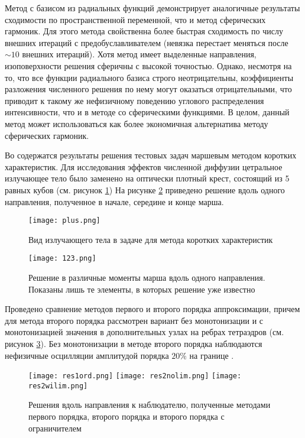 Метод с базисом из радиальных функций демонстрирует аналогичные результаты сходимости по пространственной переменной, что и метод сферических гармоник. Для этого метода свойственна более быстрая сходимость по числу внешних итераций с предобуславливателем (невязка перестает меняться после $\sim 10$ внешних итераций). Хотя метод имеет выделенные направления, изоповерхности решения сферичны с высокой точностью. Однако, несмотря на то, что все функции радиального базиса строго неотрицательны, коэффициенты разложения численного решения по нему могут оказаться отрицательными, что приводит к такому же нефизичному поведению углового распределения интенсивности, что и в методе со сферическими функциями. В целом, данный метод может использоваться как более экономичная альтернатива методу сферических гармоник.

Во  содержатся результаты решения тестовых задач маршевым методом коротких характеристик. Для исследования эффектов численной диффузии цетральное излучающее тело было заменено на оптически плотный крест, состоящий из 5 равных кубов (см. рисунок \ref{fig:plus})
На рисунке \ref{fig:march} приведено решение вдоль одного направления, полученное в начале, середине и конце марша.
\begin{figure}[ht!]
\centering
\texttt{[image: plus.png]}
\caption{Вид излучающего тела в задаче для метода коротких характеристик}
\label{fig:plus}
\end{figure}
\begin{figure}[ht!]
\centering
\texttt{[image: 123.png]}
\caption{Решение в различные моменты марша вдоль одного направления. Показаны лишь те элементы, в которых решение уже известно}
\label{fig:march}
\end{figure}

Проведено сравнение методов первого и второго порядка аппроксимации, причем для метода второго порядка рассмотрен вариант без монотонизации и с монотонизацией значения в дополнительных узлах на ребрах тетраэдров (см. рисунок \ref{fig:ord}). Без монотонизации в методе второго порядка наблюдаются нефизичные осцилляции амплитудой порядка $20\%$ на границе .
\begin{figure}[ht!]
\centering
\texttt{[image: res1ord.png]} %
\texttt{[image: res2nolim.png]} %
\texttt{[image: res2wilim.png]} %
\caption{Решения вдоль направления к наблюдателю, полученные методами первого порядка, второго порядка и второго порядка с ограничителем}
\label{fig:ord}
\end{figure}

